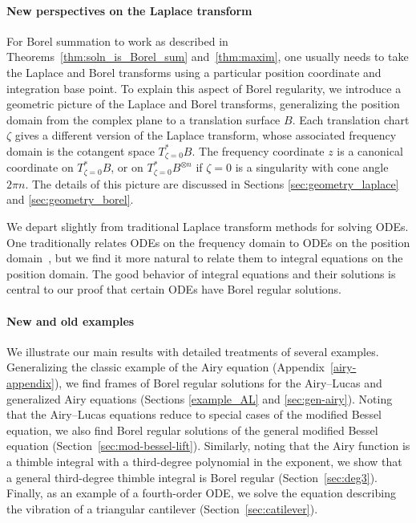 \documentclass{article}
\theoremstyle{definition}
\theoremstyle{plain}
\begin{document}
\paragraph{New perspectives on the Laplace transform}
%
For Borel summation to work as described in Theorems~\ref{thm:soln_is_Borel_sum} and~\ref{thm:maxim}, one usually needs to take the Laplace and Borel transforms using a particular position coordinate and integration base point. To explain this aspect of Borel regularity, we introduce a geometric picture of the Laplace and Borel transforms, generalizing the position domain from the complex plane to a translation surface $B$. Each translation chart $\zeta$ gives a different version of the Laplace transform, whose associated frequency domain is the cotangent space $T^*_{\zeta = 0} B$. The frequency coordinate $z$ is a canonical coordinate on $T^*_{\zeta = 0}B$, or on $T^*_{\zeta = 0}B^{\otimes n}$ if $\zeta = 0$ is a singularity with cone angle $2\pi n$. The details of this picture are discussed in Sections \ref{sec:geometry_laplace} and \ref{sec:geometry_borel}.
\begin{center}
\phaseSpaceLaplace
{}
\end{center}

We depart slightly from traditional Laplace transform methods for solving ODEs. One traditionally relates ODEs on the frequency domain to ODEs on the position domain~\cite{braaksma2006laplace,laplace-tfm}, but we find it more natural to relate them to integral equations on the position domain. The good behavior of integral equations and their solutions is central to our proof that certain ODEs have Borel regular solutions.
%
\paragraph{New and old examples}
%
We illustrate our main results with detailed treatments of several examples. Generalizing the classic example of the Airy equation (Appendix~\ref{airy-appendix}), we find frames of Borel regular solutions for the Airy--Lucas and generalized Airy equations (Sections \ref{example_AL} and \ref{sec:gen-airy}). Noting that the Airy--Lucas equations reduce to special cases of the modified Bessel equation, we also find Borel regular solutions of the general modified Bessel equation (Section~\ref{sec:mod-bessel-lift}). Similarly, noting that the Airy function is a thimble integral with a third-degree polynomial in the exponent, we show that a general third-degree thimble integral is Borel regular (Section~\ref{sec:deg3}). Finally, as an example of a fourth-order ODE, we solve the equation describing the vibration of a triangular cantilever (Section~\ref{sec:catilever}).
\end{document}
